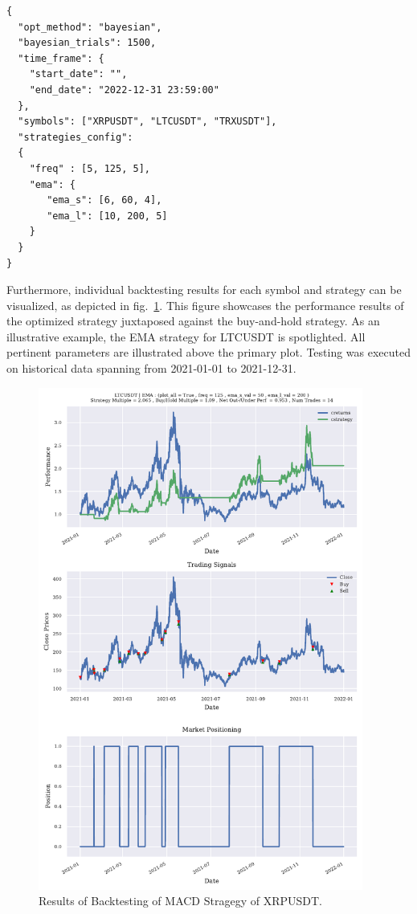 \begin{lstlisting}[style=jsonstyle, caption={Machine Learning Pipeline Configuration}]
{
  "opt_method": "bayesian",
  "bayesian_trials": 1500,
  "time_frame": {
    "start_date": "",
    "end_date": "2022-12-31 23:59:00"
  },
  "symbols": ["XRPUSDT", "LTCUSDT", "TRXUSDT"],
  "strategies_config":
  {
    "freq" : [5, 125, 5],
    "ema": {
       "ema_s": [6, 60, 4],
       "ema_l": [10, 200, 5]
    }
  }
}
\end{lstlisting}

Furthermore, individual backtesting results for each symbol and strategy can be visualized, as depicted in fig.~\ref{fig:backtest_results}.
This figure showcases the performance results of the optimized strategy juxtaposed against the buy-and-hold strategy.
As an illustrative example, the EMA strategy for LTCUSDT is spotlighted. All pertinent parameters are illustrated above the primary plot.
Testing was executed on historical data spanning from 2021-01-01 to 2021-12-31.

\begin{figure} [H]
\centering
\includegraphics[page=1, trim=0mm 0mm 0 0mm, width=0.95\textwidth, clip]{./pdf/backtesting_results.pdf}
\caption{Results of Backtesting of MACD Stragegy of XRPUSDT.}
\label{fig:backtest_results}
\end{figure}

